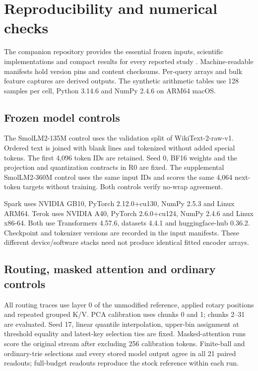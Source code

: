 \documentclass[11pt]{article}
\begin{document}
\section{Reproducibility and numerical checks}

The companion repository provides the essential frozen inputs, scientific
implementations and compact results for every reported study
\citep{padiclmrepo}. Machine-readable manifests hold version pins and content
checksums. Per-query arrays and bulk feature captures are derived outputs.
The synthetic arithmetic tables use 128 samples per cell, Python 3.14.6
and NumPy 2.4.6 on ARM64 macOS.

\subsection{Frozen model controls}
\label{app:llm-record}

The SmolLM2-135M control uses the validation split of WikiText-2-raw-v1.
Ordered text is joined with blank lines and tokenized without added special
tokens. The first 4,096 token IDs are retained. Seed 0, BF16 weights and the
projection and quantization contracts in R0 are fixed. The supplemental
SmolLM2-360M control uses the same input IDs and scores the same 4,064
next-token targets without training. Both controls verify no-wrap agreement.

Spark uses NVIDIA GB10, PyTorch 2.12.0+cu130, NumPy 2.5.3 and Linux ARM64.
Terok uses NVIDIA A40, PyTorch 2.6.0+cu124, NumPy 2.4.6 and Linux x86-64.
Both use Transformers 4.57.6, datasets 4.4.1 and huggingface-hub 0.36.2.
Checkpoint and tokenizer versions are recorded in the input manifests.
These different device/software stacks need not produce identical fitted
encoder arrays.

\subsection{Routing, masked attention and ordinary controls}

All routing traces use layer 0 of the unmodified reference, applied rotary
positions and repeated grouped K/V. PCA calibration uses chunks 0 and 1;
chunks 2--31 are evaluated. Seed 17, linear quantile interpolation,
upper-bin assignment at threshold equality and latest-key selection ties
are fixed. Masked-attention runs score the original stream after excluding
256 calibration tokens. Finite-ball and ordinary-trie selections and every
stored model output agree in all 21 paired readouts; full-budget readouts
reproduce the stock reference within each run.
\end{document}
